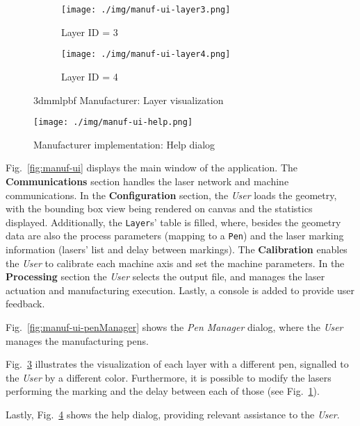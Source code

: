 \begin{figure}[htbp!]
  \centering
  \begin{subfigure}[t]{.70\textwidth}
    \texttt{[image: ./img/manuf-ui-layer3.png]}
  \caption{Layer ID = 3}%
  \label{fig:manuf-ui-layerView-1}
  \end{subfigure}
%
  \begin{subfigure}[t]{.70\textwidth}
    \texttt{[image: ./img/manuf-ui-layer4.png]}
  \caption{Layer ID = 4}%
  \label{fig:manuf-ui-layerView-2}
  \end{subfigure}
  \caption{\gls{3dmmlpbf} Manufacturer: Layer visualization}%
  \label{fig:manuf-ui-layerView}
\end{figure}

\begin{figure}[!hbt]
  \centering
  \texttt{[image: ./img/manuf-ui-help.png]} 
  \caption{Manufacturer implementation: Help dialog}%
  \label{fig:manuf-ui-help}
\end{figure}%


Fig.~\ref{fig:manuf-ui} displays the main window of the application. The
\textbf{Communications} section handles the laser network and machine
communications. In the \textbf{Configuration} section, the \emph{User} loads the
geometry, with the bounding box view being rendered on canvas and the statistics
displayed. Additionally, the \texttt{Layer}s' table is filled, where,
besides the geometry data are also the process parameters (mapping to a
\texttt{Pen}) and the laser marking information (lasers' list and delay between
markings). The \textbf{Calibration} enables the \emph{User} to calibrate each
machine axis and set the machine parameters. In the \textbf{Processing} section
the \emph{User} selects the output file, and manages the laser actuation and
manufacturing execution. Lastly, a console is added to provide user feedback.

Fig.~\ref{fig:manuf-ui-penManager} shows the \emph{Pen Manager} dialog, where
the \emph{User} manages the manufacturing pens.

Fig.~\ref{fig:manuf-ui-layerView} illustrates the visualization of each layer with
a different pen, signalled to the \emph{User} by a different color. Furthermore,
it is possible to modify the lasers performing the marking and the delay between
each of those (see Fig.~\ref{fig:manuf-ui-layerView-1}).

Lastly, Fig.~\ref{fig:manuf-ui-help} shows the help dialog, providing relevant
assistance to the \emph{User}.

